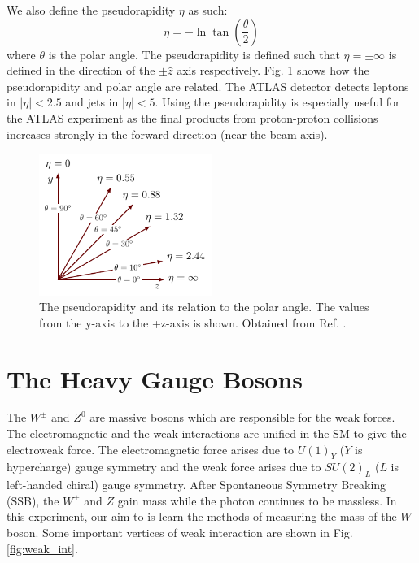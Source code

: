 \documentclass[a4paper]{report}
\numberwithin{equation}{section}
\begin{document}
We also define the pseudorapidity $\eta$ as such: 
\begin{equation}
	\eta = -\ln \tan (\frac{\theta}{2})
\end{equation}
where $\theta$ is the polar angle. The pseudorapidity is defined such that $\eta = \pm\infty$ is defined in the direction of the 
$\pm \hat{z}$ axis respectively. Fig. \ref{fig:pseudorap} shows how the pseudorapidity and polar angle are related. The ATLAS 
detector detects leptons in $|\eta| < 2.5$ and jets in $|\eta| < 5$.
Using the pseudorapidity is especially useful for the ATLAS experiment as the final products from proton-proton collisions increases 
strongly in the forward direction (near the beam axis). 

\begin{figure}[htpb]
    \centering
    \includegraphics[width=0.5\textwidth]{pseudorapidity.pdf}
    \caption{The pseudorapidity and its relation to the polar angle. The values from the y-axis to the +z-axis is shown. 
	Obtained from Ref. \cite{Izaak2017}.}
    \label{fig:pseudorap}
\end{figure}


\section{The Heavy Gauge Bosons} \label{sec:gauge_bosons}

The $W^{\pm}$ and $Z^0$ are massive bosons which are responsible for the weak forces. The electromagnetic and the weak interactions are unified in the SM to give the electroweak force. The electromagnetic force arises due to $U(1)_{Y}$ ($Y$ is hypercharge) gauge symmetry and the weak force arises due to $SU(2)_L$ ($L$ is left-handed chiral) gauge symmetry. After Spontaneous Symmetry Breaking (SSB), the $W^{\pm}$ and $Z$ gain mass while the photon continues to be massless. In this experiment, our aim to is learn the methods of measuring the mass of the $W$ boson. Some important vertices of weak interaction are shown in Fig. \ref{fig:weak_int}.
\end{document}
